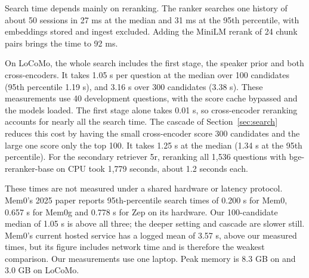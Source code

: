 Search time depends mainly on reranking. The ranker searches one \lmes{} history of about 50 sessions in 27 ms at the median and 31 ms at the 95th percentile, with embeddings stored and ingest excluded. Adding the MiniLM rerank of 24 chunk pairs brings the time to 92 ms.

On LoCoMo, the whole search includes the first stage, the speaker prior and both cross-encoders. It takes 1.05 s per question at the median over 100 candidates (95th percentile 1.19 s), and 3.16 s over 300 candidates (3.38 s). These measurements use 40 development questions, with the score cache bypassed and the models loaded. The first stage alone takes 0.01 s, so cross-encoder reranking accounts for nearly all the search time. The cascade of Section~\ref{sec:search} reduces this cost by having the small cross-encoder score 300 candidates and the large one score only the top 100. It takes 1.25 s at the median (1.34 s at the 95th percentile). For the secondary retriever 5r, reranking all 1,536 questions with bge-reranker-base on CPU took 1,779 seconds, about 1.2 seconds each.

These times are not measured under a shared hardware or latency protocol. Mem0's 2025 paper reports 95th-percentile search times of 0.200 s for Mem0, 0.657 s for Mem0g and 0.778 s for Zep on its hardware. Our 100-candidate median of 1.05 s is above all three; the deeper setting and cascade are slower still. Mem0's current hosted service has a logged mean of 3.57 s, above our measured times, but its figure includes network time and is therefore the weakest comparison. Our measurements use one laptop. Peak memory is 8.3 GB on \lmes{} and 3.0 GB on LoCoMo.
